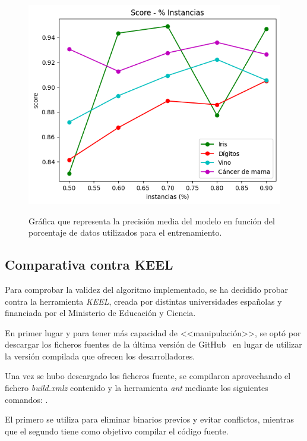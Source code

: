 \begin{figure}[h]
	\caption{Gráfica que representa la precisión media del modelo en función del porcentaje de datos utilizados para el entrenamiento.}
	\centering
	\includegraphics[width=\textwidth]{../img/memoria/5_score-porcentaje_entrenamiento}
	\label{5_score-porcentaje_entrenamiento}
\end{figure}



\subsection{Comparativa contra KEEL}

Para comprobar la validez del algoritmo implementado, se ha decidido probar contra la herramienta \textit{KEEL}, creada por distintas universidades españolas y financiada por el Ministerio de Educación y Ciencia.

En primer lugar y para tener más capacidad de <<manipulación>>, se optó por descargar los ficheros fuentes de la última versión de GitHub~\cite{keelRepo} en lugar de utilizar la versión compilada que ofrecen los desarrolladores.

Una vez se hubo descargado los ficheros fuente, se compilaron aprovechando el fichero \textit{build.xmlz} contenido y la herramienta \textit{ant} mediante los siguientes comandos:  .

El primero se utiliza para eliminar binarios previos y evitar conflictos, mientras que el segundo tiene como objetivo compilar el código fuente.

